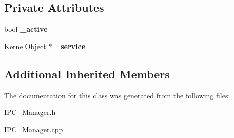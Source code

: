 \subsection*{Private Attributes}
\begin{DoxyCompactItemize}
\item 
\mbox{\label{class_ipc_service_proxy_a8afb35bc3af71f8165ddeaa8797d86e9}} 
bool {\bfseries \+\_\+active}
\item 
\mbox{\label{class_ipc_service_proxy_a365a4071024cb60e0996ff25b9831fc1}} 
\hyperlink{class_kernel_object}{Kernel\+Object} $\ast$ {\bfseries \+\_\+service}
\end{DoxyCompactItemize}
\subsection*{Additional Inherited Members}


The documentation for this class was generated from the following files\+:\begin{DoxyCompactItemize}
\item 
I\+P\+C\+\_\+\+Manager.\+h\item 
I\+P\+C\+\_\+\+Manager.\+cpp\end{DoxyCompactItemize}
